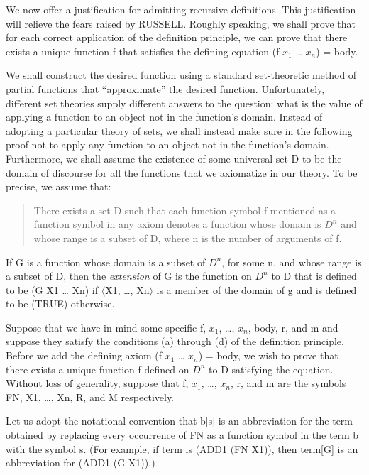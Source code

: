 \documentclass[11pt]{book}
\newenvironment{pubcrown}{\begin{quote}}{\end{quote}}
\newcommand{\pubinlineunderline}[1]{\emph{#1}}
\begin{document}
We now offer a justification for admitting recursive definitions.
This justification will relieve the fears raised by RUSSELL.
Roughly speaking, we shall prove that for each correct
application of the definition principle, we can prove
that there exists a unique function f that satisfies the
defining equation (f $x_{1}$ \ldots{} $x_{n}$) =  body.

We shall construct the desired function using a standard set-theoretic
method of partial functions that ``approximate'' the desired
function.  Unfortunately, different set theories supply different
answers to the question:  what is the value of applying a
function to an object not in the function's domain. Instead
of adopting a particular theory of sets, we shall instead
make sure in the following proof not to apply any function
to an object not in the function's domain.  Furthermore, we
shall assume the existence of some universal set D to be the
domain of discourse for all the functions that we axiomatize
in our theory.  To be precise, we assume that:
\begin{pubcrown}
There exists a set D such that each function symbol f
mentioned as a function symbol in any axiom denotes a
function whose domain is $D^{n}$ and whose range is a subset of
D, where n is the number of arguments of f.
\end{pubcrown}

If G is a function whose domain is a subset of $D^{n}$, for some n, and whose
range is a subset of D, then the
\pubinlineunderline{extension} of G is the function on $D^{n}$ to D that is
defined to be (G X1 \ldots{} Xn) if $\langle$X1, \ldots{}, Xn$\rangle$
is a member of the domain of g and is defined to be (TRUE) otherwise.

Suppose that we have in mind some specific f, $x_{1}$, \ldots{}, $x_{n}$,
body, r, and m and suppose they satisfy the conditions (a)
through (d) of the definition principle.  Before we add the
defining axiom (f $x_{1}$ \ldots{} $x_{n}$) = body, we wish to prove
that there exists a unique function f defined on $D^{n}$ to D
satisfying the equation.  Without loss of generality,
suppose
that f, $x_{1}$, \ldots{}, $x_{n}$, r, and m are the symbols FN, X1, \ldots{}, Xn, R, and M respectively.

Let us adopt the notational convention that b[s] is an
abbreviation for the term obtained by replacing every
occurrence of FN as a function symbol in the term b with the
symbol s.  (For example, if term is (ADD1 (FN X1)), then
term[G] is an abbreviation for (ADD1 (G X1)).)
\end{document}

